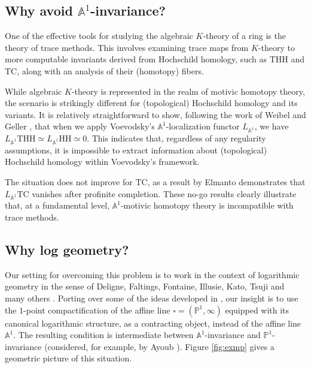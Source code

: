 \documentclass[11pt, a4paper]{amsart}
\theoremstyle{definition}
\numberwithin{equation}{subsection}
\newcommand{\HH}{\mathrm{HH}}
\newcommand{\THH}{\mathrm{THH}}
\newcommand{\TC}{\mathrm{TC}}
\newcommand{\boxx}{\square}
\begin{document}
\subsection{Why avoid $\mathbb{A}^1$-invariance?} 
One of the effective tools for studying the algebraic $K$-theory of a ring is the theory of trace methods. This involves examining trace maps from $K$-theory to more computable invariants derived from Hochschild homology, such as $\THH$ and $\TC$, along with an analysis of their (homotopy) fibers.

While algebraic $K$-theory is represented in the realm of motivic homotopy theory, the scenario is strikingly different for (topological) Hochschild homology and its variants. It is relatively straightforward to show, following the work of Weibel and Geller \cite{MR0965242}, that when we apply Voevodsky's $\mathbb{A}^1$-localization functor $L_{\mathbb{A}^1}$, we have $L_{\mathbb{A}^{1}} \THH \simeq L_{\mathbb{A}^{1}} \HH \simeq 0$. This indicates that, regardless of any regularity assumptions, it is impossible to extract information about (topological) Hochschild homology within Voevodsky's framework. 

The situation does not improve for $\TC$, as a result by Elmanto \cite{EEnonA1} demonstrates that $L_{\mathbb{A}^{1}} \TC$ vanishes after profinite completion. These no-go results clearly illustrate that, at a fundamental level, $\mathbb{A}^1$-motivic homotopy theory is incompatible with trace methods.




\subsection{Why log geometry?} 
Our setting for overcoming this problem is to work in the context of logarithmic geometry
in the sense of Deligne, Faltings, Fontaine, Illusie, Kato, Tsuji and many others \cite{Ogu}. Porting over some of the ideas developed in  \cite{logDM}, our insight is to use the $1$-point compactification of the affine line $\boxx=(\mathbb{P}^{1},\infty)$ equipped with its canonical logarithmic structure, as a contracting object, instead of the affine line $\mathbb{A}^{1}$. 
The resulting condition is intermediate between $\mathbb{A}^{1}$-invariance and $\mathbb{P}^{1}$-invariance (considered, for example, by Ayoub \cite{AyoubP1loc}). 
Figure \ref{fig:exmp} gives a geometric picture of this situation.
\end{document}
